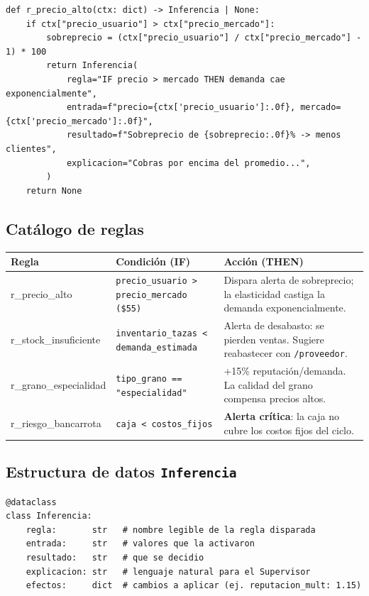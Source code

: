 \documentclass[12pt, a4paper]{article}
\begin{document}
\begin{lstlisting}[caption={Estructura de una regla}]
def r_precio_alto(ctx: dict) -> Inferencia | None:
    if ctx["precio_usuario"] > ctx["precio_mercado"]:
        sobreprecio = (ctx["precio_usuario"] / ctx["precio_mercado"] - 1) * 100
        return Inferencia(
            regla="IF precio > mercado THEN demanda cae exponencialmente",
            entrada=f"precio={ctx['precio_usuario']:.0f}, mercado={ctx['precio_mercado']:.0f}",
            resultado=f"Sobreprecio de {sobreprecio:.0f}% -> menos clientes",
            explicacion="Cobras por encima del promedio...",
        )
    return None
\end{lstlisting}

\subsection{Catálogo de reglas}

\begin{center}
\begin{tabularx}{\linewidth}{>{\ttfamily\small}l X X}
  \toprule
  \textbf{Regla} & \textbf{Condición (IF)} & \textbf{Acción (THEN)} \\
  \midrule
  r\_precio\_alto &
    \texttt{precio\_usuario > precio\_mercado (\$55)} &
    Dispara alerta de sobreprecio; la elasticidad castiga la demanda exponencialmente. \\
  \addlinespace
  r\_stock\_insuficiente &
    \texttt{inventario\_tazas < demanda\_estimada} &
    Alerta de desabasto: se pierden ventas. Sugiere reabastecer con \texttt{/proveedor}. \\
  \addlinespace
  r\_grano\_especialidad &
    \texttt{tipo\_grano == "especialidad"} &
    +15\% reputación/demanda. La calidad del grano compensa precios altos. \\
  \addlinespace
  r\_riesgo\_bancarrota &
    \texttt{caja < costos\_fijos} &
    \textbf{Alerta crítica}: la caja no cubre los costos fijos del ciclo. \\
  \bottomrule
\end{tabularx}
\end{center}

\subsection{Estructura de datos \texttt{Inferencia}}

\begin{lstlisting}
@dataclass
class Inferencia:
    regla:       str   # nombre legible de la regla disparada
    entrada:     str   # valores que la activaron
    resultado:   str   # que se decidio
    explicacion: str   # lenguaje natural para el Supervisor
    efectos:     dict  # cambios a aplicar (ej. reputacion_mult: 1.15)
\end{lstlisting}
\end{document}
